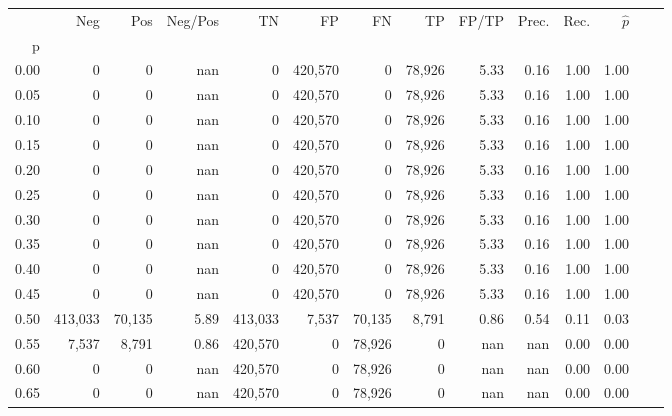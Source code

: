 \begin{tabular}{rrrrrrrrrrrrrr}
\toprule
{} &      Neg &     Pos & Neg/Pos &       TN &       FP &      FN &      TP & FP/TP & Prec. &  Rec. & $\hat{p}$ \\
p    &          &         &         &          &          &         &         &       &       &       &           \\
\midrule
0.00 &        0 &       0 &     nan &        0 &  420,570 &       0 &  78,926 &  5.33 &  0.16 &  1.00 &      1.00 \\
0.05 &        0 &       0 &     nan &        0 &  420,570 &       0 &  78,926 &  5.33 &  0.16 &  1.00 &      1.00 \\
0.10 &        0 &       0 &     nan &        0 &  420,570 &       0 &  78,926 &  5.33 &  0.16 &  1.00 &      1.00 \\
0.15 &        0 &       0 &     nan &        0 &  420,570 &       0 &  78,926 &  5.33 &  0.16 &  1.00 &      1.00 \\
0.20 &        0 &       0 &     nan &        0 &  420,570 &       0 &  78,926 &  5.33 &  0.16 &  1.00 &      1.00 \\
0.25 &        0 &       0 &     nan &        0 &  420,570 &       0 &  78,926 &  5.33 &  0.16 &  1.00 &      1.00 \\
0.30 &        0 &       0 &     nan &        0 &  420,570 &       0 &  78,926 &  5.33 &  0.16 &  1.00 &      1.00 \\
0.35 &        0 &       0 &     nan &        0 &  420,570 &       0 &  78,926 &  5.33 &  0.16 &  1.00 &      1.00 \\
0.40 &        0 &       0 &     nan &        0 &  420,570 &       0 &  78,926 &  5.33 &  0.16 &  1.00 &      1.00 \\
0.45 &        0 &       0 &     nan &        0 &  420,570 &       0 &  78,926 &  5.33 &  0.16 &  1.00 &      1.00 \\
0.50 &  413,033 &  70,135 &    5.89 &  413,033 &    7,537 &  70,135 &   8,791 &  0.86 &  0.54 &  0.11 &      0.03 \\
0.55 &    7,537 &   8,791 &    0.86 &  420,570 &        0 &  78,926 &       0 &   nan &   nan &  0.00 &      0.00 \\
0.60 &        0 &       0 &     nan &  420,570 &        0 &  78,926 &       0 &   nan &   nan &  0.00 &      0.00 \\
0.65 &        0 &       0 &     nan &  420,570 &        0 &  78,926 &       0 &   nan &   nan &  0.00 &      0.00 \\

\end{tabular}

